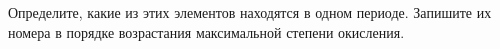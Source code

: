 Определите, какие из этих элементов находятся в одном периоде. Запишите их номера в порядке возрастания максимальной степени окисления.
